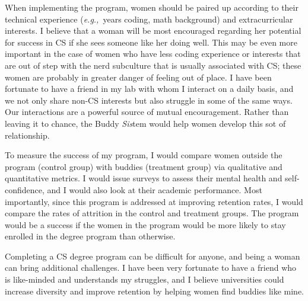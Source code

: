 \documentclass{article}
\newcommand{\ie}{{\em i.e.,}~}
\newcommand{\eg}{{\em e.g.,}~}
\begin{document}
When implementing the program, women should be paired up according to their technical experience (\eg years coding, math background) and extracurricular interests.
I believe that a woman will be most encouraged regarding her potential for success in CS if she sees someone like her doing well.
This may be even more important in the case of women who have less coding experience or interests that are out of step with the nerd subculture that is usually associated with CS; these women are probably in greater danger of feeling out of place.
I have been fortunate to have a friend in my lab with whom I interact on a daily basis, and we not only share non-CS interests but also struggle in some of the same ways.
Our interactions are a powerful source of mutual encouragement.
Rather than leaving it to chance, the Buddy \textit{Sis}tem would help women develop this sot of relationship.

To measure the success of my program, I would compare women outside the program (control group) with buddies (treatment group) via qualitative and quantitative metrics.
I would issue surveys to assess their mental health and self-confidence, and I would also look at their academic performance.
Most importantly, since this program is addressed at improving retention rates, I would compare the rates of attrition in the control and treatment groups.
The program would be a success if the women in the program would be more likely to stay enrolled in the degree program than otherwise.

Completing a CS degree program can be difficult for anyone, and being a woman can bring additional challenges.
I have been very fortunate to have a friend who is like-minded and understands my struggles, and I believe universities could increase diversity and improve retention by helping women find buddies like mine.
\end{document}
